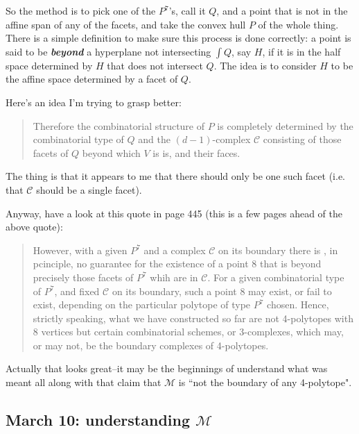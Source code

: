 So the method is to pick one of the \(P^7\)'s, call it \(Q\), and a point that is not in the affine span of any of the facets, and take the convex hull \(P\) of the whole thing. There is a simple definition to make sure this process is done correctly: a point is said to be \textit{\textbf{beyond}} a hyperplane not intersecting \(\int Q\), say \(H\), if it is in the half space determined by \(H\) that does not intersect \(Q\). The idea is to consider \(H\) to be the affine space determined by a facet of \(Q\).

Here's an idea I'm trying to grasp better:
\begin{quotation}
	Therefore the combinatorial structure of \(P\) is completely determined by the combinatorial type of \(Q\) and the \((d-1)\)-complex \(\mathcal{C}\) consisting of those facets of \(Q\) beyond which \(V\) is is, and their faces.
\end{quotation}
The thing is that it appears to me that there should only be one such facet (i.e. that \(\mathcal{C}\) should be a single facet).

Anyway, have a look at this quote in page 445 (this is a few pages ahead of the above quote):
\begin{quotation}
	However, with a given \(P^7\) and a complex \(\mathcal{C}\) on its boundary there is , in pcinciple, no guarantee for the existence of a point \(8\) that is beyond precisely those facets of \(P^7\) whih are in \(\mathcal{C}\). For a given combinatorial type of \(P^7\), and fixed \(\mathcal{C}\) on its boundary, such a point \( 8\) may exist, or fail to exist, depending on the particular polytope of type \(P^7\) chosen. Hence, strictly speaking, what we have constructed so far are not 4-polytopes with 8 vertices but certain combinatorial schemes, or 3-complexes, which may, or may not, be the boundary complexes of 4-polytopes.
\end{quotation}
Actually that looks great--it may be the beginnings of understand what was meant all along with that claim that \(\mathcal{M}\) is ``not the boundary of any  4-polytope".

\subsection{March 10: understanding \(\mathcal{M}\)}


